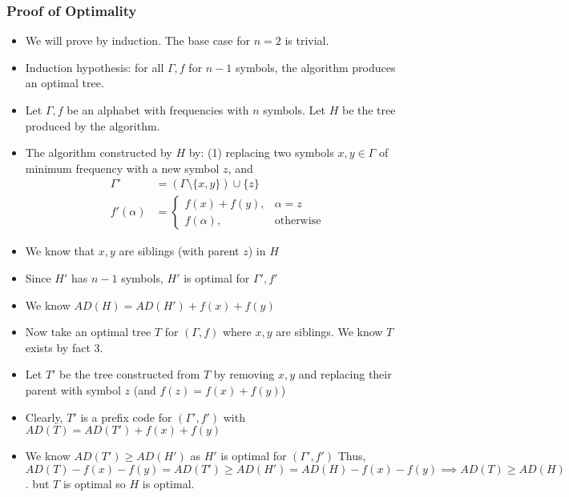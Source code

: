 \documentclass[a4paper,12pt]{article}
\begin{document}
\subsubsection{Proof of Optimality}
\begin{itemize}
    \item We will prove by induction. The base case for $n=2$ is trivial.
    \item Induction hypothesis: for all $\Gamma,f$ for $n-1$ symbols, the algorithm produces an optimal tree.
    \item Let $\Gamma,f$ be an alphabet with frequencies with $n$ symbols. Let $H$ be the tree produced by the algorithm.
    \item  The algorithm constructed by $H$ by: (1) replacing two symbols $x,y\in\Gamma$ of minimum frequency with a new symbol $z$, and
    \begin{align}
        \Gamma'&=(\Gamma\setminus\{x,y\})\cup\{z\}\\
        f'(\alpha)&=\begin{cases}
            f(x)+f(y),&\alpha=z\\
            f(\alpha),&\text{otherwise}
        \end{cases}
    \end{align}
    \item We know that $x,y$ are siblings (with parent $z$) in $H$
    \item Since $H'$ has $n-1$ symbols, $H'$ is optimal for $\Gamma',f'$
    \item We know $AD(H)=AD(H')+f(x)+f(y)$
    \item Now take an optimal tree $T$ for $(\Gamma,f)$ where $x,y$ are siblings. We know $T$ exists by fact 3.
    \item Let $T'$ be the tree constructed from $T$ by removing $x,y$ and replacing their parent with symbol $z$ (and $f(z)=f(x)+f(y)$)
    \item Clearly, $T'$ is a prefix code for $(\Gamma',f')$ with $AD(T)=AD(T')+f(x)+f(y)$
    \item We know $AD(T')\geq AD(H')$ as $H'$ is optimal for $(\Gamma',f')$ Thus, $AD(T)-f(x)-f(y)=AD(T')\geq AD(H')=AD(H)-f(x)-f(y)\implies AD(T)\geq AD(H)$. but $T$ is optimal so $H$ is optimal.
\end{itemize}
\end{document}
